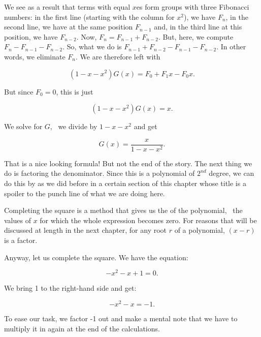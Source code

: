 \documentclass[tikz]{scrreprt}
\begin{document}
We see as a result that terms with equal $x$es form groups with 
three Fibonacci numbers: in the first line 
(starting with the column for $x^2$), we have $F_n$,
in the second line, we have at the same position $F_{n-1}$ and,
in the third line at this position, we have $F_{n-2}$.
Now, $F_n = F_{n-1} + F_{n-2}$.
But, here, we compute $F_n - F_{n-1} - F_{n-2}$.
So, what we do is $F_{n-1} + F_{n-2} - F_{n-1} - F_{n-2}$.
In other words, we eliminate $F_n$.
We are therefore left with

\begin{equation}
(1-x-x^2)G(x) = F_0 + F_1x - F_0x.
\end{equation}

But since $F_0 = 0$, this is just

\begin{equation}
(1-x-x^2)G(x) = x.
\end{equation}

We solve for $G$, \ie\ we divide by $1-x-x^2$ and get

\begin{equation}\label{eq:G1}
G(x) = \frac{x}{1-x-x^2}.
\end{equation}

That is a nice looking formula! But not the end of the story.
The next thing we do is factoring the denominator.
Since this is a polynomial of $2^{nd}$ degree,
we can do this by 
as we did before in a certain section of this chapter
whose title is a spoiler to the punch line of what
we are doing here.

Completing the square is a method that gives us the
 of the polynomial, \ie\ the values of $x$
for which the whole expression becomes zero.
For reasons that will be discussed at length in the next
chapter, for any root $r$ of a polynomial,
$(x-r)$ is a factor.

Anyway, let us complete the square. We have the equation:

\begin{equation}
-x^2 - x + 1 = 0.
\end{equation}

We bring 1 to the right-hand side and get:

\begin{equation}
-x^2 - x = -1.
\end{equation}

To ease our task, we factor -1 out and make a mental note
that we have to multiply it in again at the end of the calculations.
\end{document}
